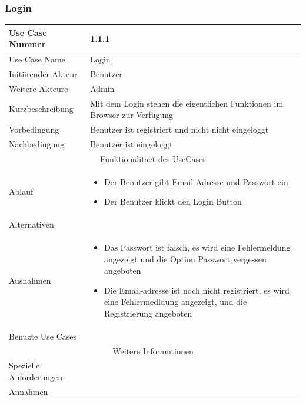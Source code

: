 \documentclass[10pt,a4paper]{article}
\begin{document}
	\subsubsection{Login}
		\begin{tabular}{|l|p{.5\linewidth}|}
		\hline Use Case Nummer & 1.1.1 \\ 
		\hline Use Case Name & Login \\ 
		\hline Initiirender Akteur & Benutzer \\
		\hline Weitere Akteure & Admin \\
		\hline Kurzbeschreibung & Mit dem Login stehen die eigentlichen Funktionen im Browser zur Verf\"ugung \\
		\hline Vorbedingung & Benutzer ist registriert und nicht nicht eingeloggt \\
		\hline Nachbedingung & Benutzer ist eingeloggt \\
		\hline \multicolumn{2}{|c|}{Funktionalitaet des UseCases}\\
		\hline Ablauf & \begin{itemize}
			\item Der Benutzer gibt Email-Adresse und Passwort ein
			\item Der Benutzer klickt den Login Button
		\end{itemize} \\
		\hline Alternativen &  \\
		\hline Ausnahmen & \begin{itemize}
			\item Das Passwort ist falsch, es wird eine Fehlermeldung angezeigt und die Option Passwort vergessen angeboten
			\item Die Email-adresse ist noch nicht registriert, es wird eine Fehlermedldung angezeigt, und die Registrierung angeboten
		\end{itemize} \\
		\hline Benuzte Use Cases &  \\
		\hline \multicolumn{2}{|c|}{Weitere Inforamtionen} \\
		\hline Spezielle Anforderungen &  \\
		\hline Annahmen &  \\
		\hline
		\end{tabular}
			 
\end{document}
